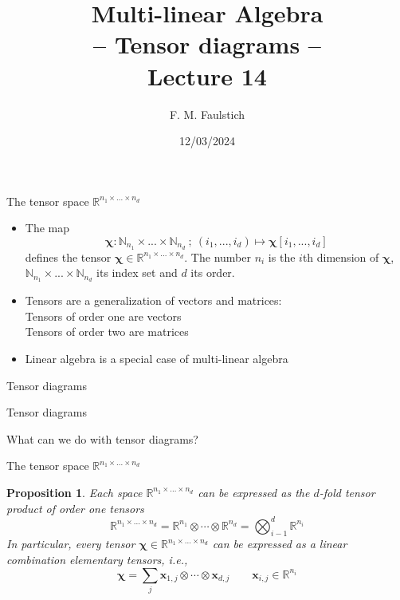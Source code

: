 \documentclass{beamer}
\title{
Multi-linear Algebra\\
-- Tensor diagrams --\\
Lecture 14
}
\author{F. M. Faulstich}
\date{12/03/2024}
\newcommand{\bgk}[1]{\boldsymbol{#1}}
\newcommand{\bchi}{\bgk{\chi}}
\newcommand{\bvec}[1]{\mathbf{#1}}
\newcommand{\vx}{\bvec{x}}
\newcommand{\bitem}{\item[$\bullet$]}
\newtheorem{proposition}[theorem]{Proposition}
\begin{document}
\frame{\titlepage}


\begin{frame}{The tensor space $\mathbb{R}^{n_1 \times ... \times n_d}$}

\begin{itemize}
    \bitem The map 
    $$
    \bchi:  \mathbb{N}_{n_1} \times ... \times \mathbb{N}_{n_d}
    ~;~ (i_1,...,i_d) \mapsto \bchi[i_1,...,i_d]
    $$
    defines the tensor $\bchi \in \mathbb{R}^{n_1\times ... \times n_d}$.
    The number $n_i$ is the $i$th dimension of $\bchi$, $ \mathbb{N}_{n_1}\times ... \times \mathbb{N}_{n_d}$ its index set and $d$ its order.
    \bitem Tensors are a generalization of vectors and matrices:\\
    Tensors of order one are vectors\\
    Tensors of order two are matrices
    \bitem Linear algebra is a special case of multi-linear algebra 
\end{itemize}
    
\end{frame}


\begin{frame}{Tensor diagrams}
    
\end{frame}

\begin{frame}{Tensor diagrams}

\begin{center}
What can we do with tensor diagrams?
\end{center}
    
\end{frame}

\begin{frame}{The tensor space $\mathbb{R}^{n_1 \times ... \times n_d}$}

\begin{proposition}{}
Each space  $\mathbb{R}^{n_1 \times ... \times n_d}$ can be expressed as the $d$-fold tensor product of order one tensors 
$$
\mathbb{R}^{n_1 \times ... \times n_d}
=
\mathbb{R}^{n_1} \otimes \cdots \otimes \mathbb{R}^{n_d}
=
\bigotimes_{i-1}^d
\mathbb{R}^{n_i}
$$
In particular, every tensor $\bchi \in \mathbb{R}^{n_1 \times ... \times n_d}$ can be expressed as a linear combination elementary tensors, i.e., 
$$
\bchi
=
\sum_j
\vx_{1,j} \otimes \cdots \otimes \vx_{d,j}
\qquad
\vx_{i,j} \in \mathbb{R}^{n_i} 
$$
\end{proposition}
\end{frame}
\end{document}
